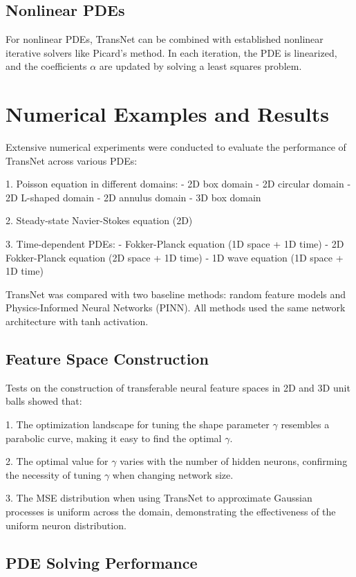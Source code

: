 \documentclass[11pt]{article}
\begin{document}
\subsection{Nonlinear PDEs}

For nonlinear PDEs, TransNet can be combined with established nonlinear iterative solvers like Picard's method. In each iteration, the PDE is linearized, and the coefficients $\alpha$ are updated by solving a least squares problem.

\section{Numerical Examples and Results}

Extensive numerical experiments were conducted to evaluate the performance of TransNet across various PDEs:

1. Poisson equation in different domains:
   - 2D box domain
   - 2D circular domain
   - 2D L-shaped domain
   - 2D annulus domain
   - 3D box domain

2. Steady-state Navier-Stokes equation (2D)

3. Time-dependent PDEs:
   - Fokker-Planck equation (1D space + 1D time)
   - 2D Fokker-Planck equation (2D space + 1D time)
   - 1D wave equation (1D space + 1D time)

TransNet was compared with two baseline methods: random feature models and Physics-Informed Neural Networks (PINN). All methods used the same network architecture with tanh activation.

\subsection{Feature Space Construction}

Tests on the construction of transferable neural feature spaces in 2D and 3D unit balls showed that:

1. The optimization landscape for tuning the shape parameter $\gamma$ resembles a parabolic curve, making it easy to find the optimal $\gamma$.

2. The optimal value for $\gamma$ varies with the number of hidden neurons, confirming the necessity of tuning $\gamma$ when changing network size.

3. The MSE distribution when using TransNet to approximate Gaussian processes is uniform across the domain, demonstrating the effectiveness of the uniform neuron distribution.

\subsection{PDE Solving Performance}
\end{document}
